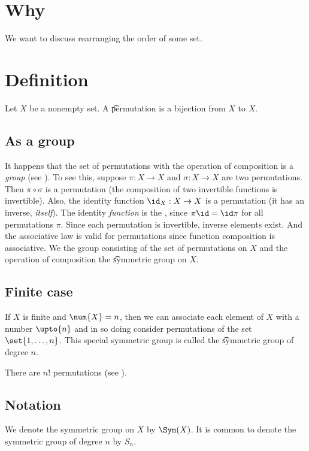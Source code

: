 
\section*{Why}

We want to discuss rearranging the order of some set.

\section*{Definition}

Let $X$ be a nonempty set.
A \t{permutation} is a bijection from $X$ to $X$.

\subsection*{As a group}

It happens that the set of permutations with the operation of composition is a \textit{group} (see ).
To see this, suppose $\pi : X \to X$ and $\sigma : X \to X$ are two permutations.
Then $\pi  \circ \sigma $ is a permutation (the composition of two invertible functions is invertible).
Also, the identity function $\id_{X}: X \to X$ is a permutation (it has an inverse, \textit{itself}).
The identity \textit{function} is the , since $\pi \id = \id\pi $ for all permutations $\pi $.
Since each permutation is invertible, inverse elements exist.
And the associative law is valid for permutations since function composition is associative.
We the group consisting of the set of permutations on $X$ and the operation of composition the \t{symmetric group on $X$}.

\subsection*{Finite case}

If $X$ is finite and $\num{X} = n$, then we can associate each element of $X$ with a number $\upto{n}$ and in so doing consider permutations of the set $\set{1, \dots , n}$.
This special symmetric group is called the \t{symmetric group of degree $n$}.

There are $n!$ permutations (see ).

\subsection*{Notation}

We denote the symmetric group on $X$ by $\Sym(X)$.
It is common to denote the symmetric group of degree $n$ by $S_n$.

\blankpage
